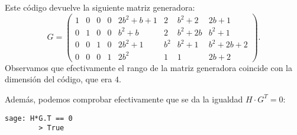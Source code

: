 \begin{exampleth}
    Este código devuelve la siguiente matriz generadora:
    \[ 
        G = 
        \left(\begin{array}{rrrrrrrr}
            1 & 0 & 0 & 0 & 2 b^{2} + b + 1 & 2 & b^{2} + 2 & 2 b + 1 \\
            0 & 1 & 0 & 0 & b^{2} + b & 2 & b^{2} + 2 b & b^{2} + 1 \\
            0 & 0 & 1 & 0 & 2 b^{2} + 1 & b^{2} & b^{2} + 1 & b^{2} + 2 b + 2 \\
            0 & 0 & 0 & 1 & 2 b^{2} & 1 & 1 & 2 b + 2
            \end{array}\right).
    \]
    Observamos que efectivamente el rango de la matriz generadora coincide con la dimensión del código, que era $4$.

    Además, podemos comprobar efectivamente que se da la igualdad $H \cdot G^T = 0$:

    \begin{lstlisting}[gobble=4]
        sage: H*G.T == 0
        > True
    \end{lstlisting}
\end{exampleth}

